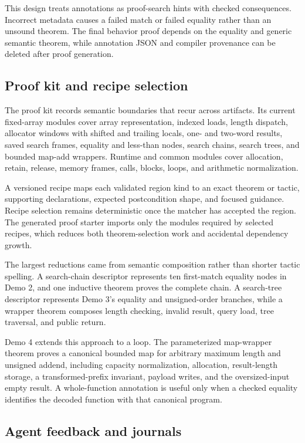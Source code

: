 \documentclass[11pt]{article}
\begin{document}
This design treats annotations as proof-search hints with checked consequences.  Incorrect metadata causes a failed match or failed equality rather than an unsound theorem.  The final behavior proof depends on the equality and generic semantic theorem, while annotation JSON and compiler provenance can be deleted after proof generation.

\subsection{Proof kit and recipe selection}

The proof kit records semantic boundaries that recur across artifacts.  Its current fixed-array modules cover array representation, indexed loads, length dispatch, allocator windows with shifted and trailing locals, one- and two-word results, saved search frames, equality and less-than nodes, search chains, search trees, and bounded map-add wrappers.  Runtime and common modules cover allocation, retain, release, memory frames, calls, blocks, loops, and arithmetic normalization.

A versioned recipe maps each validated region kind to an exact theorem or tactic, supporting declarations, expected postcondition shape, and focused guidance.  Recipe selection remains deterministic once the matcher has accepted the region.  The generated proof starter imports only the modules required by selected recipes, which reduces both theorem-selection work and accidental dependency growth.

The largest reductions came from semantic composition rather than shorter tactic spelling.  A search-chain descriptor represents ten first-match equality nodes in Demo 2, and one inductive theorem proves the complete chain.  A search-tree descriptor represents Demo 3's equality and unsigned-order branches, while a wrapper theorem composes length checking, invalid result, query load, tree traversal, and public return.

Demo 4 extends this approach to a loop.  The parameterized map-wrapper theorem proves a canonical bounded map for arbitrary maximum length and unsigned addend, including capacity normalization, allocation, result-length storage, a transformed-prefix invariant, payload writes, and the oversized-input empty result.  A whole-function  annotation is useful only when a checked equality identifies the decoded function with that canonical program.

\subsection{Agent feedback and journals}
\end{document}

